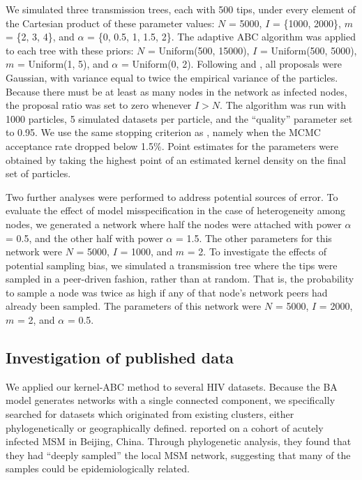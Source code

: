 \documentclass[12pt]{article}\usepackage[]{graphicx}\usepackage[]{color}
\newcommand{\sett}[1]{\{#1\}}
\begin{document}
We simulated three transmission trees, each with 500 tips, under every element
of the Cartesian product of these parameter values: $N$ = 5000, $I$ =
\sett{1000, 2000}, $m$ = \sett{2, 3, 4}, and $\alpha$ = \sett{0, 0.5, 1, 1.5,
2}. The adaptive \gls{ABC} algorithm was applied to each tree with these
priors: $N$ = Uniform(500, 15000), $I$ = Uniform(500, 5000), $m$ = Uniform(1,
5), and $\alpha$ = Uniform(0, 2). Following \textcite{del2012adaptive} and
\textcite{beaumont2009adaptive}, all proposals were Gaussian, with variance
equal to twice the empirical variance of the particles. Because there must be
at least as many nodes in the network as infected nodes, the proposal ratio was
set to zero whenever $I > N$. The algorithm was run with 1000 particles, 5
simulated datasets per particle, and the ``quality'' parameter set to 0.95. We
use the same stopping criterion as \textcite{del2012adaptive}, namely when the
MCMC acceptance rate dropped below 1.5\%. Point estimates for the parameters
were obtained by taking the highest point of an estimated kernel density on the
final set of particles.

Two further analyses were performed to address potential sources of error. To
evaluate the effect of model misspecification in the case of heterogeneity
among nodes, we generated a network where half the nodes were attached with
power $\alpha$ = 0.5, and the other half with power $\alpha$ = 1.5. The other
parameters for this network were $N$ = 5000, $I$ = 1000, and $m$ = 2. To
investigate the effects of potential sampling bias, we simulated a transmission
tree where the tips were sampled in a peer-driven fashion, rather than at
random. That is, the probability to sample a node was twice as high if any of
that node's network peers had already been sampled. The parameters of this
network were $N$ = 5000, $I$ = 2000, $m$ = 2, and $\alpha$ = 0.5.

\subsection*{Investigation of published data}

We applied our kernel-ABC method to several HIV datasets. Because the \gls{BA}
model generates networks with a single connected component, we specifically
searched for datasets which originated from existing clusters, either
phylogenetically or geographically defined. \textcite{wang2015targeting}
reported on a cohort of acutely infected \gls{MSM} in Beijing, China. Through
phylogenetic analysis, they found that they had ``deeply sampled'' the
local \gls{MSM} network, suggesting that many of the samples could be
epidemiologically related.
\end{document}
